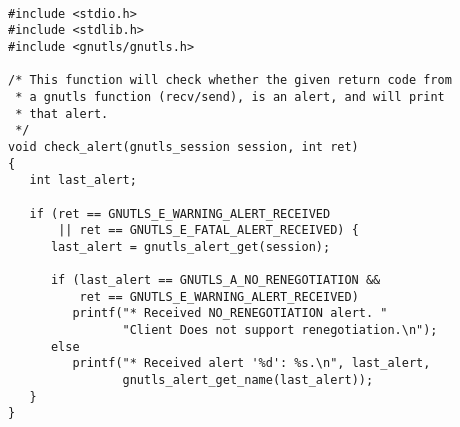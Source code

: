\begin{verbatim}

#include <stdio.h>
#include <stdlib.h>
#include <gnutls/gnutls.h>

/* This function will check whether the given return code from
 * a gnutls function (recv/send), is an alert, and will print
 * that alert.
 */
void check_alert(gnutls_session session, int ret)
{
   int last_alert;

   if (ret == GNUTLS_E_WARNING_ALERT_RECEIVED
       || ret == GNUTLS_E_FATAL_ALERT_RECEIVED) {
      last_alert = gnutls_alert_get(session);

      if (last_alert == GNUTLS_A_NO_RENEGOTIATION &&
          ret == GNUTLS_E_WARNING_ALERT_RECEIVED)
         printf("* Received NO_RENEGOTIATION alert. "
                "Client Does not support renegotiation.\n");
      else
         printf("* Received alert '%d': %s.\n", last_alert,
                gnutls_alert_get_name(last_alert));
   }
}

\end{verbatim}
